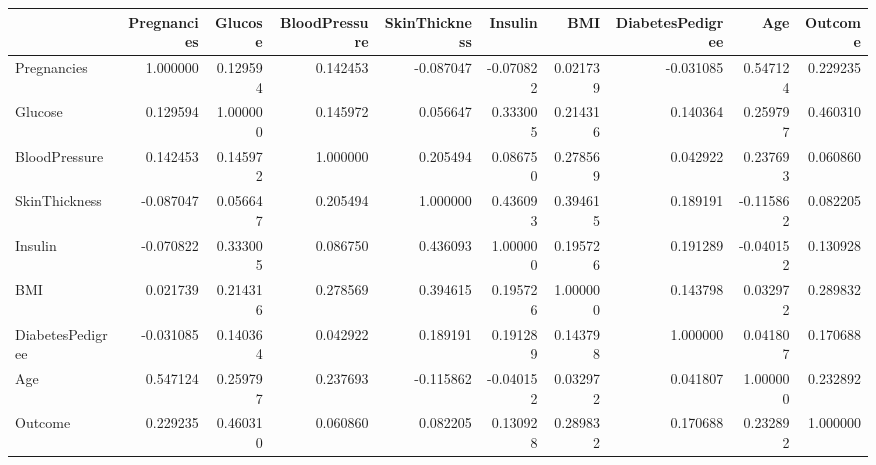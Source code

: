 \begin{tabular}{lrrrrrrrrr}
\toprule
{} &  Pregnancies &   Glucose &  BloodPressure &  SkinThickness &   Insulin &       BMI &  DiabetesPedigree &       Age &   Outcome \\
\midrule
Pregnancies      &     1.000000 &  0.129594 &       0.142453 &      -0.087047 & -0.070822 &  0.021739 &         -0.031085 &  0.547124 &  0.229235 \\
Glucose          &     0.129594 &  1.000000 &       0.145972 &       0.056647 &  0.333005 &  0.214316 &          0.140364 &  0.259797 &  0.460310 \\
BloodPressure    &     0.142453 &  0.145972 &       1.000000 &       0.205494 &  0.086750 &  0.278569 &          0.042922 &  0.237693 &  0.060860 \\
SkinThickness    &    -0.087047 &  0.056647 &       0.205494 &       1.000000 &  0.436093 &  0.394615 &          0.189191 & -0.115862 &  0.082205 \\
Insulin          &    -0.070822 &  0.333005 &       0.086750 &       0.436093 &  1.000000 &  0.195726 &          0.191289 & -0.040152 &  0.130928 \\
BMI              &     0.021739 &  0.214316 &       0.278569 &       0.394615 &  0.195726 &  1.000000 &          0.143798 &  0.032972 &  0.289832 \\
DiabetesPedigree &    -0.031085 &  0.140364 &       0.042922 &       0.189191 &  0.191289 &  0.143798 &          1.000000 &  0.041807 &  0.170688 \\
Age              &     0.547124 &  0.259797 &       0.237693 &      -0.115862 & -0.040152 &  0.032972 &          0.041807 &  1.000000 &  0.232892 \\
Outcome          &     0.229235 &  0.460310 &       0.060860 &       0.082205 &  0.130928 &  0.289832 &          0.170688 &  0.232892 &  1.000000 \\
\bottomrule
\end{tabular}

